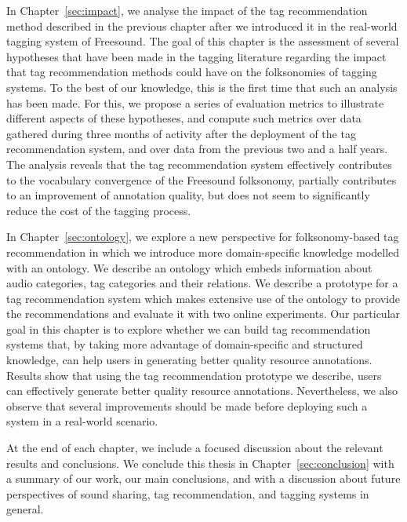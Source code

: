 In Chapter~\ref{sec:impact}, we analyse the impact of the tag recommendation method described in the previous chapter after we introduced it in the real-world tagging system of Freesound.
The goal of this chapter is the assessment of several hypotheses that have been made in the tagging literature regarding the impact that tag recommendation methods could have on the folksonomies of tagging systems. 
To the best of our knowledge, this is the first time that such an analysis has been made.
For this, we propose a series of evaluation metrics to illustrate different aspects of these hypotheses, and compute such metrics over data gathered during three months of activity after the deployment of the tag recommendation system, and over data from the previous two and a half years.
The analysis reveals that the tag recommendation system effectively contributes to the vocabulary convergence of the Freesound folksonomy, partially contributes to an improvement of annotation quality, but does not seem to significantly reduce the cost of the tagging process.

In Chapter~\ref{sec:ontology}, we explore a new perspective for folksonomy-based tag recommendation in which we introduce more domain-specific knowledge modelled with an ontology. We describe an ontology which embeds information about audio categories, tag categories and their relations. We describe a prototype for a tag recommendation system which makes extensive use of the ontology to provide the recommendations and evaluate it with two online experiments. 
Our particular goal in this chapter is to explore whether we can build tag recommendation systems that, by taking more advantage of domain-specific and structured knowledge, can help users in generating better quality resource annotations. Results show that using the tag recommendation prototype we describe, users can effectively generate better quality resource annotations. Nevertheless, we also observe that several improvements should be made before deploying such a system in a real-world scenario.

At the end of each chapter, we include a focused discussion about the relevant results and conclusions.
We conclude this thesis in Chapter~\ref{sec:conclusion} with a summary of our work, our main conclusions, and with a discussion about future perspectives of sound sharing, tag recommendation, and tagging systems in general.